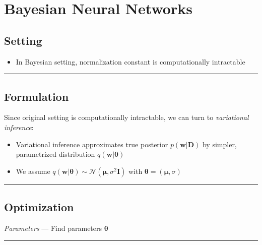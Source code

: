 \section{Bayesian Neural Networks}
\subsection*{Setting}
\begin{itemize}
    \item In Bayesian setting, normalization constant is computationally intractable
\end{itemize}

{\color{black}\hrule height 0.001mm}

\subsection*{Formulation}
Since original setting is computationally intractable, we can turn to \emph{variational inference}:
\begin{itemize}
    \item Variational inference approximates true posterior $p(\boldsymbol{w}|\boldsymbol{D})$ by simpler, parametrized distribution $q(\boldsymbol{w}|\boldsymbol{\theta})$
    \item We assume $q(\boldsymbol{w}|\boldsymbol{\theta}) \sim \mathcal{N}(\boldsymbol{\mu}, \sigma^2 \boldsymbol{I})$ with $\boldsymbol{\theta} = (\boldsymbol{\mu}, \sigma)$ 
\end{itemize}

{\color{black}\hrule height 0.001mm}

\subsection*{Optimization}
\emph{Parameters} --- Find parameters $\boldsymbol{\theta}$

{\color{lightgray}\hrule height 0.001mm}

